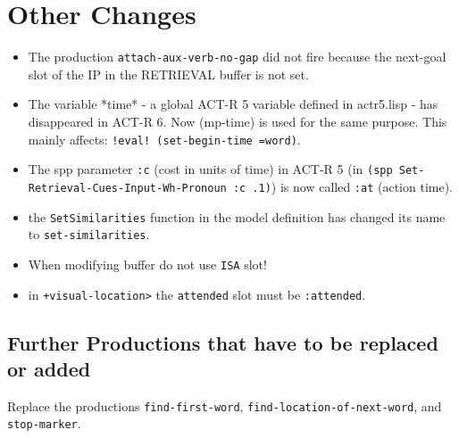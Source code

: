\documentclass[nobf,fignum,doc,longtable]{apa}
\begin{document}
\section{Other Changes}

\begin{itemize}
\item The production \texttt{attach-aux-verb-no-gap} did not fire because the next-goal slot of the IP in the RETRIEVAL buffer is not set.
\item The variable *time* - a global ACT-R 5 variable defined in actr5.lisp - has disappeared in ACT-R 6. Now (mp-time) is used for the same purpose. This mainly affects: \texttt{!eval! (set-begin-time =word)}.
\item The spp parameter \texttt{:c} (cost in units of time) in ACT-R 5 (in \texttt{(spp Set-Retrieval-Cues-Input-Wh-Pronoun :c .1)}) is now called \texttt{:at} (action time).
\item the \texttt{SetSimilarities} function in the model definition has changed its name to \texttt{set-similarities}.
\item When modifying buffer do not use \texttt{ISA} slot!
\item in \texttt{+visual-location>} the \texttt{attended} slot must be \texttt{:attended}.
\end{itemize}


\subsection{Further Productions that have to be replaced or added}
Replace the productions \texttt{find-first-word}, \texttt{find-location-of-next-word}, and \texttt{stop-marker}.
\end{document}
